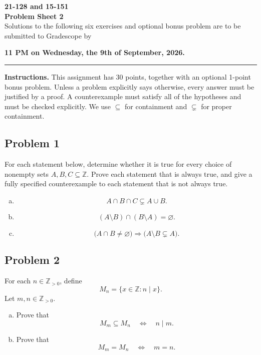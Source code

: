 \documentclass[11pt]{article}
\newcommand{\Z}{\mathbb{Z}}
\newcommand{\problem}[2]{\subsection*{Problem #1 \hfill \normalfont[#2 points]}}
\begin{document}
\pagestyle{empty}

\begin{center}
    {\Large\bfseries 21-128 and 15-151}\\[3pt]
    {\LARGE\bfseries Problem Sheet 2}\\[7pt]

Solutions to the following six exercises and optional bonus problem are to be 
submitted to Gradescope by

\textbf{11 PM on Wednesday, the 9th of September, 2026.}

\end{center}



\hrule
\vspace{0.6em}

\textbf{Instructions.}
This assignment has 30 points, together with an optional 1-point bonus problem.
Unless a problem explicitly says otherwise, every answer must be justified by a proof.
A counterexample must satisfy all of the hypotheses and must be checked explicitly.
We use $\subseteq$ for containment and $\subsetneq$ for proper containment.

\problem{1}{4}
For each statement below, determine whether it is true for every choice of nonempty sets $A,B,C\subseteq\Z$.
Prove each statement that is always true, and give a fully specified counterexample to each statement that is not always true.
\begin{enumerate}[(a)]
    \item
    \[
        A\cap B\cap C\subsetneq A\cup B.
    \]

    \item
    \[
        (A\setminus B)\cap(B\setminus A)=\varnothing.
    \]

    \item
    \[
        \bigl(A\cap B\ne\varnothing\bigr)
        \Longrightarrow
        \bigl(A\setminus B\subsetneq A\bigr).
    \]
\end{enumerate}

\problem{2}{5}
For each $n\in\Z_{>0}$, define
\[
    M_n=\{x\in\Z:n\mid x\}.
\]
Let $m,n\in\Z_{>0}$.
\begin{enumerate}[(a)]
    \item Prove that
    \[
        M_m\subseteq M_n
        \quad\Longleftrightarrow\quad
        n\mid m.
    \]

    \item Prove that
    \[
        M_m=M_n
        \quad\Longleftrightarrow\quad
        m=n.
    \]
\end{enumerate}
\end{document}
